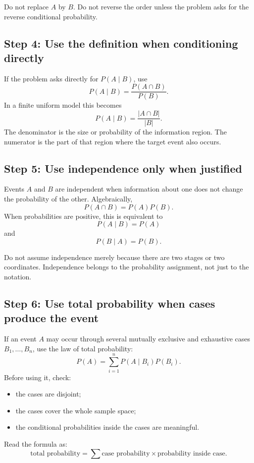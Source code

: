 Do not replace \(A\) by \(B\). Do not reverse the order unless the problem asks
for the reverse conditional probability.

\subsection*{Step 4: Use the definition when conditioning directly}

If the problem asks directly for \(P(A\mid B)\), use
\[
P(A\mid B)=\frac{P(A\cap B)}{P(B)}.
\]
In a finite uniform model this becomes
\[
P(A\mid B)=\frac{|A\cap B|}{|B|}.
\]
The denominator is the size or probability of the information region. The
numerator is the part of that region where the target event also occurs.

\subsection*{Step 5: Use independence only when justified}

Events \(A\) and \(B\) are independent when information about one does not change
the probability of the other. Algebraically,
\[
P(A\cap B)=P(A)P(B).
\]
When probabilities are positive, this is equivalent to
\[
P(A\mid B)=P(A)
\]
and
\[
P(B\mid A)=P(B).
\]

Do not assume independence merely because there are two stages or two
coordinates. Independence belongs to the probability assignment, not just to the
notation.

\subsection*{Step 6: Use total probability when cases produce the event}

If an event \(A\) may occur through several mutually exclusive and exhaustive
cases \(B_1,
\ldots,B_n\), use the law of total probability:
\[
P(A)=\sum_{i=1}^n P(A\mid B_i)P(B_i).
\]
Before using it, check:
\begin{itemize}
    \item the cases are disjoint;
    \item the cases cover the whole sample space;
    \item the conditional probabilities inside the cases are meaningful.
\end{itemize}

Read the formula as:
\[
\text{total probability}=\sum \text{case probability}\times\text{probability inside case}.
\]

